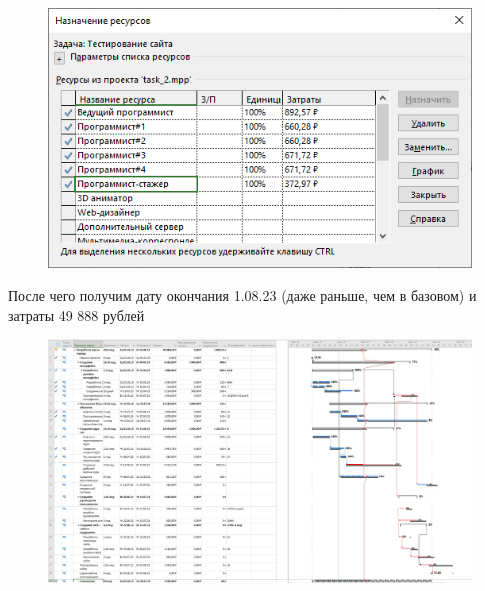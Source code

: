\begin{figure}[H]
	\begin{center}
		\includegraphics[width=\textwidth]{imgs/task_1_25.png}
	\end{center}
\end{figure}

После чего получим дату окончания 1.08.23 (даже раньше, чем в базовом) и затраты 49 888 рублей

\begin{figure}[H]
	\begin{center}
		\includegraphics[width=\textwidth]{imgs/task_1_26.png}
	\end{center}
\end{figure}